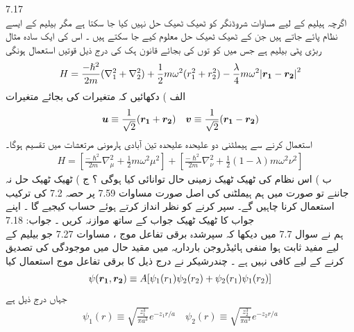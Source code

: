 7.17\\
اگرچہ ہیلیم کے لیے مساوات شروڈنگر کو ٹھیک ٹھیک حل نہیں کیا جا سکتا ہے مگر بیلیم کے ایسے نظام پائے جاتے ہیں جن کے ٹھیک ٹھیک حل معلوم کیے جا سکتے ہیں ۔ اس کی ایک  سادہ مثال ربڑی پٹی بیلیم ہے جس میں کو توں کی بجائے قانون ہک کی درج ذیل قوتیں استعمال ہونگی
\begin{align}
H=\frac{-\hslash^{2}}{2m}(\nabla_{1}^{2}+\nabla_{2}^{2})+\frac{1}{2}m\omega^{2}(r_{1}^{2}+r_{2}^{2})-\frac{\lambda}{4}m\omega^{2}\abs{{{\boldsymbol{r_{1}}}}-{{\boldsymbol{r_{2}}}}}^{2} 
\end{align}
 الف ) دکھائیں کہ متغیرات  کی بجائے متغیرات
\begin{align}
{\ensuremath{{\boldsymbol{u}}}}\equiv\frac{1}{\sqrt{2}}({{\boldsymbol{r_{1}}}}+{{\boldsymbol{r_{2}}}})\quad {\ensuremath{{\boldsymbol{v}}}}\equiv\frac{1}{\sqrt{2}}({{\boldsymbol{r_{1}}}}-{{\boldsymbol{r_{2}}}})
\end{align}
 استعمال کرنے سے ہیملٹنی دو علیحدہ علیحدہ تین آبادی ہارمونی  مرتعشات میں تقسیم ہوگا۔
\begin{align}
H=[\frac{-\hslash^{2}}{2m}\nabla_{\mu}^{2}+\frac{1}{2}m\omega^{2}\mu^{2}]+[\frac{-\hslash^{2}}{2m}\nabla_{\nu}^{2}+\frac{1}{2}(1-\lambda)m\omega^{2}\nu^{2}]
\end{align}
 ب ) اس نظام کی ٹھیک ٹھیک زمینی حال توانائی کیا ہوگی ؟
ج ) ٹھیک ٹھیک حل نہ جاننے تو صورت میں ہم ہیملٹنی کی اصل صورت مساوات 7.59 پر حصہ 7.2 کی ترکیب استعمال کرنا چاہیں گے۔
سپر کرنے کو نظر انداز کرتے ہوئے حساب کیجیے گا ۔ اپنے جواب کا ٹھیک ٹھیک جواب کے ساتھ موازنہ کریں ۔
جواب: 
7.18\\
ہم نے سوال 7.7 میں دیکھا کہ سپرشدہ برقی تفاعل موج ، مساوات 7.27 جو بیلیم کے لیے مفید ثابت ہوا منفی ہائیڈروجن بارداریہ میں مقید حال میں موجودگی کی تصدیق کرنے کے لیے کافی نہیں ہے ۔ چندرشیكر  نے درج ذیل کا برقی تفاعل موج استعمال کیا
\begin{align}
\psi({{\boldsymbol{r_{1}}}},{{\boldsymbol{r_{2}}}})\equiv A[\psi_{1}(r_{1})\psi_{2}(r_{2})+\psi_{2}(r_{1})\psi_{1}(r_{2})]
\end{align}
 جہاں درج ذیل ہے
\begin{align}
\psi_{1}(r)\equiv \sqrt{\frac{z_{1}^{3}}{\pi a^{3}}}e^{-z_{1}r/a} \quad \psi_{2}(r)\equiv \sqrt{\frac{z_{2}^{3}}{\pi a^{3}}}e^{-z_{2}r/a} 
\end{align}
 
